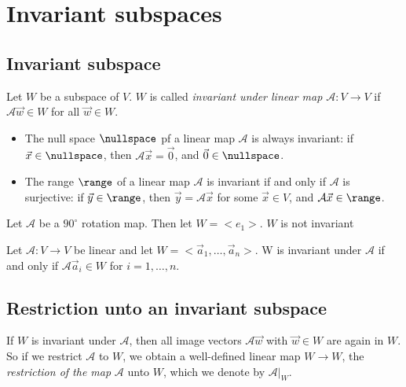 \section{Invariant subspaces}
\subsection{Invariant subspace}
\begin{definition}
    Let $W$ be a subspace of $V$. $W$ is called \emph{invariant under linear map $\mathcal{A}: V \to V$} if $\mathcal{A}\vec{w} \in W$ for all $\vec{w} \in W$.
\end{definition}

\begin{example}
    \begin{itemize}
        \item The null space $\nullspace$ pf a linear map $\mathcal{A}$ is always invariant: if $\vec{x} \in \nullspace$, then $\mathcal{A}\vec{x} = \vec{0}$,
            and $\vec{0} \in \nullspace$.
        \item The range $\range$ of a linear map $\mathcal{A}$ is invariant if and only if $\mathcal{A}$ is surjective: if $\vec{y} \in \range$,
            then $\vec{y} = \mathcal{A}\vec{x}$ for some $\vec{x} \in V$, and $\mathcal{A}\vec{x} \in \range$.
    \end{itemize}
\end{example}

\begin{example}
    Let $\mathcal{A}$ be a $90^\circ$ rotation map. Then let $W = <e_1>$. $W$ is not invariant
\end{example}

\begin{theorem}
    Let $\mathcal{A}: V \to V$ be linear and let $W = <\vec{a}_1, \dots, \vec{a}_n>$. W is invariant under $\mathcal{A}$ if
    and only if $\mathcal{A}\vec{a}_i \in W$ for $i = 1,\dots,n$.
\end{theorem}

\subsection{Restriction unto an invariant subspace}
\begin{definition}
    If $W$ is invariant under $\mathcal{A}$, then all image vectors $\mathcal{A}\vec{w}$ with $\vec{w} \in W$ are again in $W$.
    So if we restrict $\mathcal{A}$ to $W$, we obtain a well-defined linear map $W \to W$, the \emph{restriction of the map} $\mathcal{A}$
    unto $W$, which we denote by $\mathcal{A}|_W$.
\end{definition}

